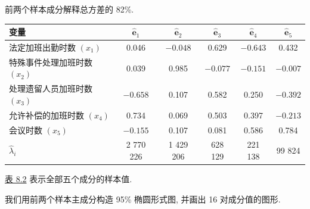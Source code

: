 前两个样本成分解释总方差的 82\%.

\begin{mvtable}
\label{tab:8.1}
\begin{tabular}{lccccc}
\toprule
变量 & $\hat{\mathbf{e}}_1$ & $\hat{\mathbf{e}}_2$ & $\hat{\mathbf{e}}_3$ & $\hat{\mathbf{e}}_4$ & $\hat{\mathbf{e}}_5$\\
\midrule
法定加班出勤时数 $(x_1)$ & 0.046 & $-0.048$ & 0.629 & $-0.643$ & 0.432\\
特殊事件处理加班时数 $(x_2)$ & 0.039 & 0.985 & $-0.077$ & $-0.151$ & $-0.007$\\
处理遗留人员加班时数 $(x_3)$ & $-0.658$ & 0.107 & 0.582 & 0.250 & $-0.392$\\
允许补偿的加班时数 $(x_4)$ & 0.734 & 0.069 & 0.503 & 0.397 & $-0.213$\\
会议时数 $(x_5)$ & $-0.155$ & 0.107 & 0.081 & 0.586 & 0.784\\
\midrule
$\hat{\lambda}_i$ & 2 770 226 & 1 429 206 & 628 129 & 221 138 & 99 824\\
\bottomrule
\end{tabular}
\end{mvtable}

\hyperref[tab:8.2]{表 8.2} 表示全部五个成分的样本值.

我们用前两个样本主成分构造 95\% 椭圆形式图, 并画出 16 对成分值的图形.
